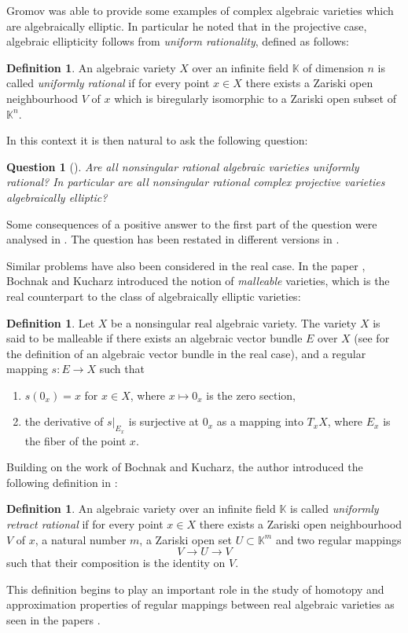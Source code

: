 \documentclass{amsart}
\theoremstyle{plain}
\newtheorem{que}[thm]{Question}
\theoremstyle{definition}
\newtheorem{defi}[thm]{Definition}
\theoremstyle{remark}
\numberwithin{equation}{section}
\newcommand{\K}{\mathbb{K}}
\begin{document}
Gromov was able to provide some examples of complex algebraic varieties which are algebraically elliptic. In particular he noted that in the projective case, algebraic ellipticity follows from \emph{uniform rationality}, defined as follows:
\begin{defi}
An algebraic variety $X$ over an infinite field $\K$ of dimension $n$ is called \emph{uniformly rational} if for every point $x\in X$ there exists a Zariski open neighbourhood $V$ of $x$ which is biregularly isomorphic to a Zariski open subset of $\K^n$.
\end{defi}

In this context it is then natural to ask the following question:
\begin{que}[{\cite[p. 883 and 885]{Gromov}}]\label{que_Gromov}
Are all nonsingular rational algebraic varieties uniformly rational? In particular are all nonsingular rational complex projective varieties algebraically elliptic?
\end{que}
Some consequences of a positive answer to the first part of the question were analysed in \cite{Bogomolov}. The question has been restated in different versions in \cite{Zaidenberg3,Zaidenberg2,Zaidenberg_survey}.


Similar problems have also been considered in the real case. In the paper \cite{real_homogeneous}, Bochnak and Kucharz introduced the notion of \emph{malleable} varieties, which is the real counterpart to the class of algebraically elliptic varieties:
\begin{defi}
Let $X$ be a nonsingular real algebraic variety. The variety $X$ is said to be malleable if there exists an algebraic vector bundle $E$ over $X$ (see \cite[Definition 12.1.6]{RAG} for the definition of an algebraic vector bundle in the real case), and a regular mapping $s:E\rightarrow X$ such that
\begin{enumerate}
    \item $s(0_x)=x$ for $x\in X$, where $x\mapsto 0_x$ is the zero section,
    \item the derivative of $s\vert_{E_x}$ is surjective at $0_x$ as a mapping into $T_x X$, where $E_x$ is the fiber of the point $x$.
\end{enumerate}
\end{defi}


Building on the work of Bochnak and Kucharz, the author introduced the following definition in \cite{RelativeSW}:
\begin{defi}
An algebraic variety over an infinite field $\K$ is called \emph{uniformly retract rational} if for every point $x\in X$ there exists a Zariski open neighbourhood $V$ of $x$, a natural number $m$, a Zariski open set $U\subset \K^m$ and two regular mappings
\begin{equation*}
    V\rightarrow U\rightarrow V 
\end{equation*}
such that their composition is the identity on $V$.
\end{defi}
This definition begins to play an important role in the study of homotopy and approximation properties of regular mappings between real algebraic varieties as seen in the papers \cite{RelativeSW,bilski+kucharz,spaces_of_maps}.
\end{document}
